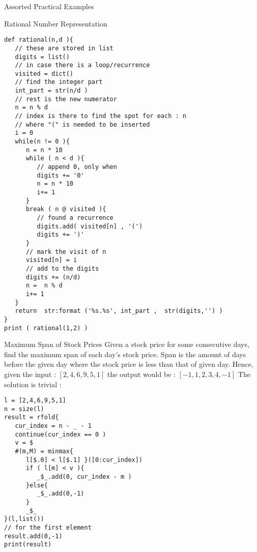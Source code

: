 \begin{section}{Assorted Practical Examples}
\begin{subsection}{Rational Number Representation}
\begin{center}\begin{minipage}{\linewidth}
\begin{lstlisting}[style=JexlStyle]
def rational(n,d ){
   // these are stored in list
   digits = list() 
   // in case there is a loop/recurrence 
   visited = dict()
   // find the integer part 
   int_part = str(n/d ) 
   // rest is the new numerator 
   n = n % d  
   // index is there to find the spot for each : n
   // where "(" is needed to be inserted 
   i = 0 
   while(n != 0 ){
      n = n * 10
      while ( n < d ){
         // append 0, only when 
         digits += '0'
         n = n * 10 
         i+= 1 
      }  
      break ( n @ visited ){ 
         // found a recurrence 
         digits.add( visited[n] , '(') 
         digits += ')' 
      }
      // mark the visit of n 
      visited[n] = i  
      // add to the digits 
      digits += (n/d)
      n =  n % d 
      i+= 1 
   }
   return  str:format ('%s.%s', int_part ,  str(digits,'') )    
}
print ( rational(1,2) )
\end{lstlisting}  
\end{minipage}\end{center}

\end{subsection}

\begin{subsection}{Maximum Span of Stock Prices}
Given a stock price for some consecutive days, find the maximum span of each day's stock price. 
Span is the amount of days before the given day where the stock price is less than that of given day. 
Hence, given the input : $[2,4,6,9,5,1]$ the output would be :  $[-1, 1, 2, 3, 4, -1]$
The solution is trivial :

\begin{center}\begin{minipage}{\linewidth}
\begin{lstlisting}[style=JexlStyle]
l = [2,4,6,9,5,1]
n = size(l)
result = rfold{
   cur_index = n - _ - 1 
   continue(cur_index == 0 ) 
   v = $ 
   #(m,M) = minmax{ 
      l[$.0] < l[$.1] }([0:cur_index])
      if ( l[m] < v ){ 
         _$_.add(0, cur_index - m )
      }else{
         _$_.add(0,-1)
      }
      _$_ 
}(l,list())
// for the first element 
result.add(0,-1)
print(result)
\end{lstlisting}  
\end{minipage}\end{center}
\end{subsection}


\end{section}
